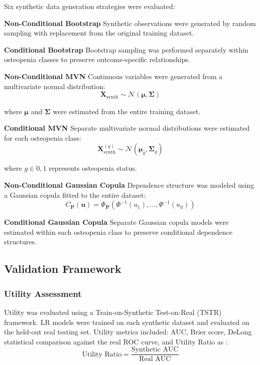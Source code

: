 \documentclass[twoside]{article}
\begin{document}
\noindent Six synthetic data generation strategies were evaluated:

\textbf{Non-Conditional Bootstrap} Synthetic observations were generated by random sampling with replacement from the original training dataset.

\textbf{Conditional Bootstrap} Bootstrap sampling was performed separately within osteopenia classes to preserve outcome-specific relationships.

\textbf{Non-Conditional MVN} Continuous variables were generated from a multivariate normal distribution:
\[
\mathbf{X}_{\mathrm{synth}}
\sim
\mathcal{N}
\left(
\boldsymbol{\mu},
\boldsymbol{\Sigma}
\right)
\]

\noindent where $\boldsymbol{\mu}$ and $\boldsymbol{\Sigma}$ were estimated from the entire training dataset.

\textbf{Conditional MVN} Separate multivariate normal distributions were estimated for each osteopenia class:
\[
\mathbf{X}_{\mathrm{synth}}^{(g)}
\sim
\mathcal{N}
\left(
\boldsymbol{\mu}_g,
\boldsymbol{\Sigma}_g
\right)
\]

\noindent where $g \in {0,1}$ represents osteopenia status.

\textbf{Non-Conditional Gaussian Copula} Dependence structure was modeled using a Gaussian copula fitted to the entire dataset:
\[
C_{\mathbf{P}}(\mathbf{u}) =
\Phi_{\mathbf{P}}
\left(
\Phi^{-1}(u_1), \ldots, \Phi^{-1}(u_d)
\right)
\]

\textbf{Conditional Gaussian Copula} Separate Gaussian copula models were estimated within each osteopenia class to preserve conditional dependence structures.

\subsection{Validation Framework}

\subsubsection{Utility Assessment}

\noindent Utility was evaluated using a Train-on-Synthetic Test-on-Real (TSTR) framework. LR models were trained on each synthetic dataset and evaluated on the held-out real testing set. Utility metrics included: AUC, Brier score, DeLong statistical comparison against the real ROC curve, and Utility Ratio as \cite{hernandez2025comprehensive}:
\[
\text{Utility Ratio} =
\frac{\text{Synthetic AUC}}
{\text{Real AUC}}
\]
\end{document}
